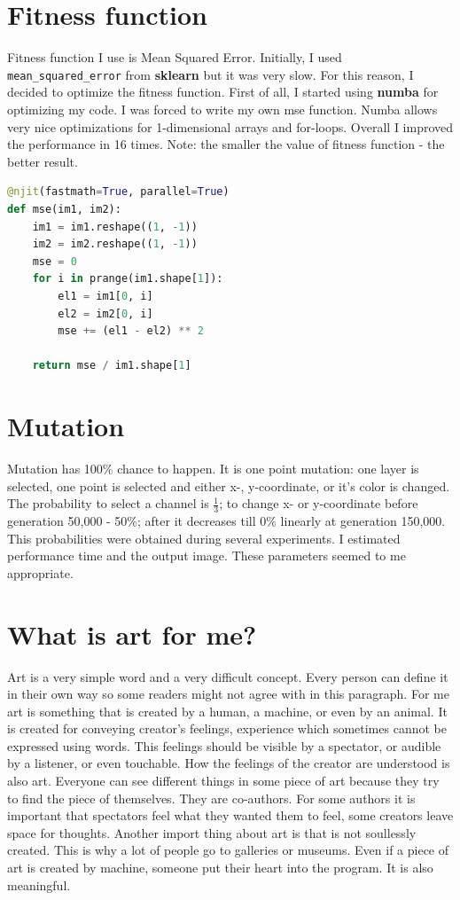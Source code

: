 \documentclass{article}
\begin{document}
\section{Fitness function}
Fitness function I use is Mean Squared Error. Initially, I used \texttt{mean\_squared\_error} from \textbf{sklearn} but it was very slow. For this reason, I decided to optimize the fitness function. First of all, I started using \textbf{numba} for optimizing my code. I was forced to write my own mse function. Numba allows very nice optimizations for 1-dimensional arrays and for-loops. Overall I improved the performance in 16 times. Note: the smaller the value of fitness function - the better result.
\begin{lstlisting}[language=Python]
@njit(fastmath=True, parallel=True)
def mse(im1, im2):
    im1 = im1.reshape((1, -1))
    im2 = im2.reshape((1, -1))
    mse = 0
    for i in prange(im1.shape[1]):
        el1 = im1[0, i]
        el2 = im2[0, i]
        mse += (el1 - el2) ** 2

    return mse / im1.shape[1]
\end{lstlisting}

\section{Mutation}
Mutation has 100\% chance to happen. It is one point mutation: one layer is selected, one point is selected and either x-, y-coordinate, or it's color is changed. The probability to select a channel is $\frac{1}{3}$; to change x- or y-coordinate before generation 50,000 - 50\%; after it decreases till 0\% linearly at generation 150,000.
This probabilities were obtained during several experiments. I estimated performance time and the output image. These parameters seemed to me appropriate.

\section{What is art for me?}
Art is a very simple word and a very difficult concept. Every person can define it in their own way so some readers might not agree with in this paragraph. For me art is something that is created by a human, a machine, or even by an animal. It is created for conveying creator's feelings, experience which sometimes cannot be expressed using words. This feelings should be visible by a spectator, or audible by a listener, or even touchable. How the feelings of the creator are understood is also art. Everyone can see different things in some piece of art because they try to find the piece of themselves. They are co-authors. For some authors it is important that spectators feel what they wanted them to feel, some creators leave space for thoughts. Another import thing about art is that is not soullessly created. This is why a lot of people go to galleries or museums. Even if a piece of art is created by machine, someone put their heart into the program. It is also meaningful.
\end{document}
